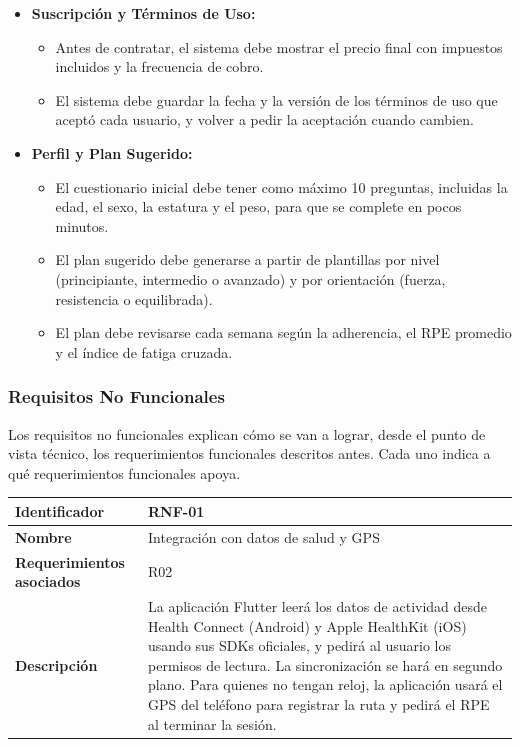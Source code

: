 \begin{itemize}
\begin{itemize}
    \end{itemize}
    \item \textbf{Suscripción y Términos de Uso:}
    \begin{itemize}
        \item Antes de contratar, el sistema debe mostrar el precio final con impuestos incluidos y la frecuencia de cobro.
        \item El sistema debe guardar la fecha y la versión de los términos de uso que aceptó cada usuario, y volver a pedir la aceptación cuando cambien.
    \end{itemize}
    \item \textbf{Perfil y Plan Sugerido:}
    \begin{itemize}
        \item El cuestionario inicial debe tener como máximo 10 preguntas, incluidas la edad, el sexo, la estatura y el peso, para que se complete en pocos minutos.
        \item El plan sugerido debe generarse a partir de plantillas por nivel (principiante, intermedio o avanzado) y por orientación (fuerza, resistencia o equilibrada).
        \item El plan debe revisarse cada semana según la adherencia, el RPE promedio y el índice de fatiga cruzada.
    \end{itemize}
\end{itemize}
\newpage
\subsubsection{Requisitos No Funcionales}
Los requisitos no funcionales explican cómo se van a lograr, desde el punto de vista técnico, los requerimientos funcionales descritos antes. Cada uno indica a qué requerimientos funcionales apoya.

\begin{table}[h!]
    \centering
    \renewcommand{\arraystretch}{1.3}
    \begin{tabular}{|p{3.5cm}|p{11.5cm}|}
        \hline
        \rowcolor[HTML]{EFEFEF}
        \textbf{Identificador} & \textbf{RNF-01} \\ \hline
        \textbf{Nombre} & Integración con datos de salud y GPS \\ \hline
        \textbf{Requerimientos asociados} & R02 \\ \hline
        \textbf{Descripción} & La aplicación Flutter leerá los datos de actividad desde Health Connect (Android) y Apple HealthKit (iOS) usando sus SDKs oficiales, y pedirá al usuario los permisos de lectura. La sincronización se hará en segundo plano. Para quienes no tengan reloj, la aplicación usará el GPS del teléfono para registrar la ruta y pedirá el RPE al terminar la sesión. \\ \hline
    \end{tabular}
\end{table}

